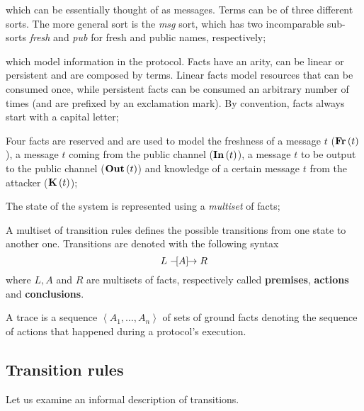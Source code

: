 \begin{description}[style=nextline]
  \item[Terms] which can be essentially thought of as messages. Terms can be of three different sorts. The more general sort is the \textit{msg} sort, which has two incomparable sub-sorts \textit{fresh} and \textit{pub} for fresh and public names, respectively;
  \item[Facts] which model information in the protocol. Facts have an arity, can be linear or persistent and are composed by terms. Linear facts model resources that can be consumed once, while persistent facts can be consumed an arbitrary number of times (and are prefixed by an exclamation mark). By convention, facts always start with a capital letter;
  \item[Special facts] Four facts are reserved and are used to model the freshness of a message $t$ ($\mbox{\textbf{Fr}}\left(t\right)$), a message $t$ coming from the public channel ($\mbox{\textbf{In}}\left(t\right)$), a message $t$ to be output to the public channel ($\mbox{\textbf{Out}}\left(t\right)$) and knowledge of a certain message $t$ from the attacker ($\mbox{\textbf{K}}\left(t\right)$);
  \item[State of the system] The state of the system is represented using a \textit{multiset} of facts;
  \item[Transition rules] A multiset of transition rules defines the possible transitions from one state to another one. Transitions are denoted with the following syntax
    \begin{equation}
      L \mathrel{-\hspace{-2pt}[A]\hspace{-4pt}\to} R
    \end{equation}
    where $L, A$ and $R$ are multisets of facts, respectively called \textbf{premises}, \textbf{actions} and \textbf{conclusions}.
  \item[Trace] A trace is a sequence $\left<A_1, \ldots, A_n\right>$ of sets of ground facts denoting the sequence of actions that happened during a protocol's execution.
\end{description}


\subsection{Transition rules}
\label{sub:Transition-rules}
Let us examine an informal description of transitions.

